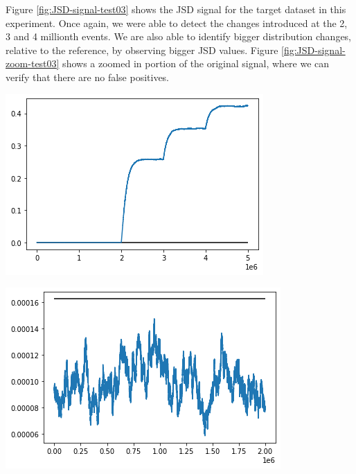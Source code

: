 Figure \ref{fig:JSD-signal-test03} shows the JSD signal for the target dataset in this experiment. Once again, we were able to detect the changes introduced at the 2, 3 and 4 millionth events. We are also able to identify bigger distribution changes, relative to the reference, by observing bigger JSD values. Figure \ref{fig:JSD-signal-zoom-test03} shows a zoomed in portion of the original signal, where we can verify that there are no false positives.
\begin{center}
\begin{minipage}{.5\textwidth}
  \centering
  \includegraphics[width=1\linewidth]{figures/stream-analysis-viz-test03.png}
  \label{fig:JSD-signal-test03}
\end{minipage}%
\begin{minipage}{.5\textwidth}
  \centering
  \includegraphics[width=1\linewidth]{figures/stream-analysis-viz-zoom-test03.png}
  \label{fig:JSD-signal-zoom-test03}
\end{minipage}
\end{center}


